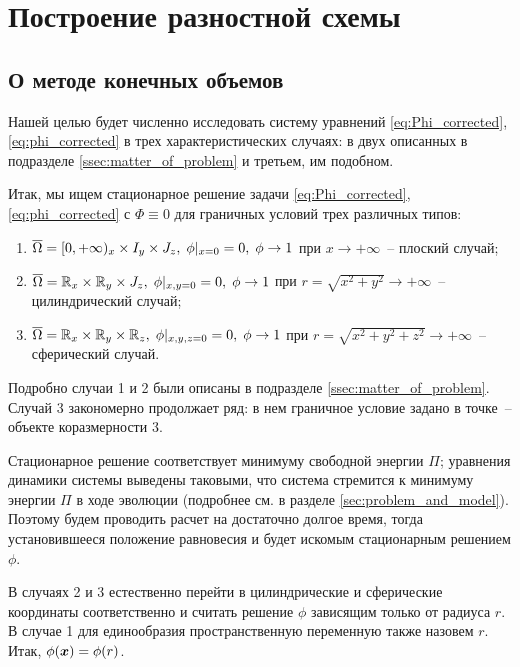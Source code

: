 
\section{Построение разностной схемы}

\subsection{О методе конечных объемов}

Нашей целью будет численно исследовать систему уравнений \eqref{eq:Phi_corrected}, \eqref{eq:phi_corrected} в трех характеристических случаях: в двух описанных в подразделе \ref{ssec:matter_of_problem} и третьем, им подобном.

Итак, мы ищем стационарное решение задачи \eqref{eq:Phi_corrected}, \eqref{eq:phi_corrected} с $\Phi \equiv 0$ для граничных условий трех различных типов:
\begin{enumerate}
	\item ${\overline{\Omega}} = [0, +\infty)_x \times I_y \times J_z, \; \phi|_{x = 0} = 0, \; \phi \to 1$ при $x \to +\infty$~-- плоский случай;
	\item ${\overline{\Omega}} = {\mathbb{R}}_x \times {\mathbb{R}}_y \times J_z, \; \phi|_{x, y = 0} = 0, \; \phi \to 1$ при $r = \sqrt{x^2 + y^2} \to +\infty$~-- цилиндрический случай;
	\item ${\overline{\Omega}} = {\mathbb{R}}_x \times {\mathbb{R}}_y \times {\mathbb{R}}_z, \; \phi|_{x, y, z = 0} = 0, \; \phi \to 1$ при $r = \sqrt{x^2 + y^2 + z^2} \to +\infty$~-- сферический случай.
\end{enumerate}
Подробно случаи 1 и 2 были описаны в подразделе \ref{ssec:matter_of_problem}. Случай 3 закономерно продолжает ряд: в нем граничное условие задано в точке~-- объекте коразмерности 3.

Стационарное решение соответствует минимуму свободной энергии $\Pi$; \linebreak уравнения динамики системы выведены таковыми, что система стремится к минимуму энергии $\Pi$ в ходе эволюции (подробнее см. в разделе \ref{sec:problem_and_model}). Поэтому будем проводить расчет на достаточно долгое время, тогда установившееся положение равновесия и будет искомым стационарным решением $\phi$.

В случаях 2 и 3 естественно перейти в цилиндрические и сферические координаты соответственно и считать решение $\phi$ зависящим только от радиуса $r$. В случае 1 для единообразия пространственную переменную также назовем $r$. Итак, $\phi({\boldsymbol{x}}) = \phi(r)$.

